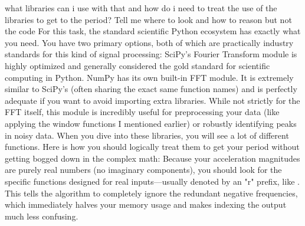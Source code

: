 {}\markdownRendererThematicBreak{}\markdownRendererInterblockSeparator
{}
\markdownRendererSectionEnd 
\markdownRendererSectionEnd \markdownRendererSectionBegin
{}\markdownRendererInterblockSeparator
{}what libraries can i use with that and how do i need to treat the use of the libraries to get to the period? Tell me where to look and how to reason but not the code\markdownRendererInterblockSeparator
{}
\markdownRendererSectionEnd \markdownRendererSectionBegin
{}\markdownRendererInterblockSeparator
{}For this task, the standard scientific Python ecosystem has exactly what you need.\markdownRendererInterblockSeparator
{}\markdownRendererSectionBegin
{}\markdownRendererInterblockSeparator
{}You have two primary options, both of which are practically industry standards for this kind of signal processing:\markdownRendererInterblockSeparator
{}\markdownRendererOlBegin
{} SciPy's Fourier Transform module is highly optimized and generally considered the gold standard for scientific computing in Python.\markdownRendererOlItemEnd 
{} NumPy has its own built-in FFT module. It is extremely similar to SciPy's (often sharing the exact same function names) and is perfectly adequate if you want to avoid importing extra libraries.\markdownRendererOlItemEnd 
{} While not strictly for the FFT itself, this module is incredibly useful for preprocessing your data (like applying the window functions I mentioned earlier) or robustly identifying peaks in noisy data.\markdownRendererOlItemEnd 
\markdownRendererOlEnd \markdownRendererInterblockSeparator
{}
\markdownRendererSectionEnd \markdownRendererSectionBegin
{}\markdownRendererInterblockSeparator
{}When you dive into these libraries, you will see a lot of different functions. Here is how you should logically treat them to get your period without getting bogged down in the complex math:\markdownRendererInterblockSeparator
{}\markdownRendererUlBegin
\markdownRendererUlItem {} Because your acceleration magnitudes are purely real numbers (no imaginary components), you should look for the specific functions designed for real inputs—usually denoted by an "r" prefix, like . This tells the algorithm to completely ignore the redundant negative frequencies, which immediately halves your memory usage and makes indexing the output much less confusing.\markdownRendererUlItemEnd 
